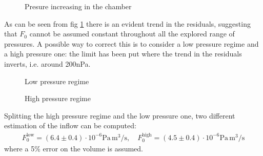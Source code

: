 \documentclass[11pt,a4 paper]{article}
\begin{document}
\begin{figure}[H]
  \centering
   \hspace{-0.05\textwidth}
  \caption{Presure increasing in the chamber}
  \label{fig:increase_all}
\end{figure}

As can be seen from fig \ref{fig:increase_all} there is an evident trend in the residuals, suggesting that $F_0$ cannot be assumed constant throughout all the explored range of pressures. A possible way to correct this is to consider a low pressure regime and a high pressure one: the limit has been put where the trend in the residuals inverts, i.e. around 200\si{\nano\pascal}.
\begin{figure}[H]
  \centering
   \hspace{-0.05\textwidth}
  \caption{Low pressure regime}
  \label{fig:increase_lowP}
\end{figure}
\begin{figure}[H]
  \centering
   \hspace{-0.05\textwidth}
  \caption{High pressure regime}
  \label{fig:increase_highP}
\end{figure}


Splitting the high pressure regime and the low pressure one, two different estimation of the inflow can be computed:
\begin{gather*}
  F_0^\text{low} = (6.4 \pm 0.4) \cdot 10^{-6} \si{\pascal}\, \si{\metre^3}/\si{\second}, \quad
  F_0^\text{high} = (4.5 \pm 0.4) \cdot 10^{-6} \si{\pascal}\, \si{\metre^3}/\si{\second}
\end{gather*}
where a 5\% error on the volume is assumed.
\end{document}
